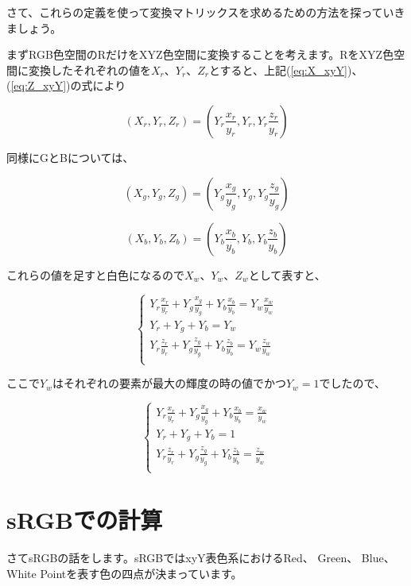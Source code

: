 \documentclass[12pt]{jsarticle}
\begin{document}
さて、これらの定義を使って変換マトリックスを求めるための方法を探っていきましょう。

まずRGB色空間のRだけをXYZ色空間に変換することを考えます。RをXYZ色空間に変換したそれぞれの値を$X_r$、$Y_r$、$Z_r$とすると、上記(\ref{eq:X_xyY})、(\ref{eq:Z_xyY})の式により

\[ ( X_r, Y_r, Z_r ) = (Y_r \frac{x_r}{y_r}, Y_r, Y_r \frac{z_r}{y_r}) \]

同様にGとBについては、

\[ ( X_g, Y_g, Z_g ) = (Y_g \frac{x_g}{y_g}, Y_g, Y_g \frac{z_g}{y_g}) \]

\[ ( X_b, Y_b, Z_b ) = (Y_b \frac{x_b}{y_b}, Y_b, Y_b \frac{z_b}{y_b}) \]

これらの値を足すと白色になるので$X_w$、$Y_w$、$Z_w$として表すと、

\[
\begin{cases}

Y_r \frac{x_r}{y_r} + Y_g \frac{x_g}{y_g} + Y_b \frac{x_b}{y_b} = Y_w \frac{x_w}{y_w} \\

Y_r + Y_g + Y_b = Y_w \\

Y_r \frac{z_r}{y_r} + Y_g \frac{z_g}{y_g} + Y_b \frac{z_b}{y_b} = Y_w \frac{z_w}{y_w} \\

\end{cases}
\]

ここで$Y_w$はそれぞれの要素が最大の輝度の時の値でかつ$Y_w = 1$でしたので、

\[
\begin{cases}

Y_r \frac{x_r}{y_r} + Y_g \frac{x_g}{y_g} + Y_b \frac{x_b}{y_b} = \frac{x_w}{y_w} \\

Y_r + Y_g + Y_b = 1 \\

Y_r \frac{z_r}{y_r} + Y_g \frac{z_g}{y_g} + Y_b \frac{z_b}{y_b} = \frac{z_w}{y_w} \\

\end{cases}
\]

\section{sRGBでの計算}

さてsRGBの話をします。sRGBではxyY表色系におけるRed、 Green、 Blue、 White Pointを表す色の四点が決まっています。
\end{document}
